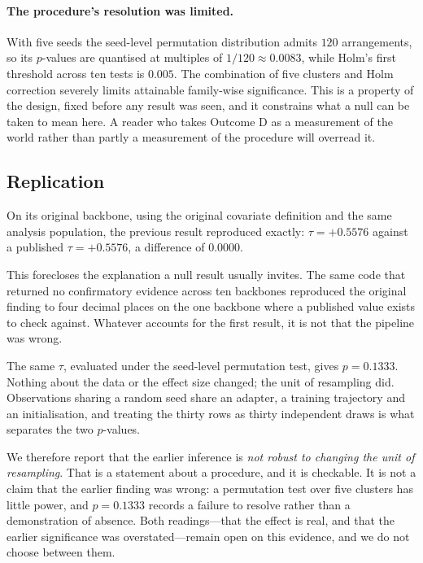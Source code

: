 \documentclass[11pt,a4paper]{article}
\begin{document}
\paragraph{The procedure's resolution was limited.} With five seeds the
seed-level permutation distribution admits $120$ arrangements, so its $p$-values
are quantised at multiples of $1/120 \approx 0.0083$, while Holm's first
threshold across ten tests is $0.005$. The combination of five clusters and Holm
correction severely limits attainable family-wise significance. This is a
property of the design, fixed before any result was seen, and it constrains what
a null can be taken to mean here. A reader who takes Outcome D as a measurement
of the world rather than partly a measurement of the procedure will overread it.

\subsection{Replication}

On its original backbone, using the original covariate definition and the same
analysis population, the previous result reproduced exactly:
$\tau = +0.5576$ against a published $\tau = +0.5576$, a difference of $0.0000$.

This forecloses the explanation a null result usually invites. The same code that
returned no confirmatory evidence across ten backbones reproduced the original
finding to four decimal places on the one backbone where a published value exists
to check against. Whatever accounts for the first result, it is not that the
pipeline was wrong.

The same $\tau$, evaluated under the seed-level permutation test, gives
$p = 0.1333$. Nothing about the data or the effect size changed; the unit of
resampling did. Observations sharing a random seed share an adapter, a training
trajectory and an initialisation, and treating the thirty rows as thirty
independent draws is what separates the two $p$-values.

We therefore report that the earlier inference is \emph{not robust to changing
the unit of resampling}. That is a statement about a procedure, and it is
checkable. It is not a claim that the earlier finding was wrong: a permutation
test over five clusters has little power, and $p = 0.1333$ records a failure to
resolve rather than a demonstration of absence. Both readings---that the effect
is real, and that the earlier significance was overstated---remain open on this
evidence, and we do not choose between them.
\end{document}

